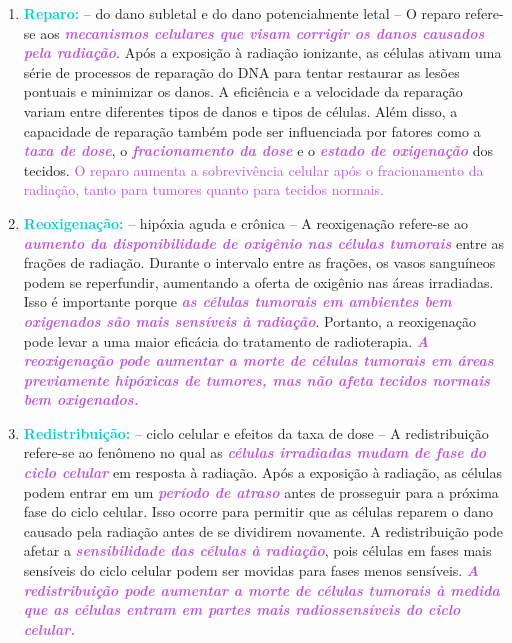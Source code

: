 \documentclass[11pt,a4paper]{article}
\begin{document}
	\begin{enumerate}
		\item \textcolor{DarkTurquoise}{\textbf{Reparo:}} -- do dano subletal e do dano potencialmente letal -- O reparo refere-se aos \textcolor{MediumOrchid}{\textbf{\textit{mecanismos celulares que visam corrigir os danos causados pela radiação}}}. Após a exposição à radiação ionizante, as células ativam uma série de processos de reparação do DNA para tentar restaurar as lesões pontuais e minimizar os danos. A eficiência e a velocidade da reparação variam entre diferentes tipos de danos e tipos de células. Além disso, a capacidade de reparação também pode ser influenciada por fatores como a \textcolor{MediumOrchid}{\textbf{\textit{ taxa de dose}}}, o \textcolor{MediumOrchid}{\textbf{\textit{fracionamento da dose}}} e o \textcolor{MediumOrchid}{\textbf{\textit{estado de oxigenação}}} dos tecidos. \textcolor{MediumOrchid}{O reparo aumenta a sobrevivência celular após o fracionamento da radiação, tanto para tumores quanto para tecidos normais.}
		
		\item \textcolor{DarkTurquoise}{\textbf{Reoxigenação:}} -- hipóxia aguda e crônica -- A reoxigenação refere-se ao \textcolor{MediumOrchid}{\textbf{\textit{aumento da disponibilidade de oxigênio nas células tumorais}}} entre as frações de radiação. Durante o intervalo entre as frações, os vasos sanguíneos podem se reperfundir, aumentando a oferta de oxigênio nas áreas irradiadas. Isso é importante porque \textcolor{MediumOrchid}{\textbf{\textit{as células tumorais em ambientes bem oxigenados são mais sensíveis à radiação}}}. Portanto, a reoxigenação pode levar a uma maior eficácia do tratamento de radioterapia. \textcolor{MediumOrchid}{\textbf{\textit{A reoxigenação pode aumentar a morte de células tumorais em áreas previamente hipóxicas de tumores, mas não afeta tecidos normais bem oxigenados.}}}
				
		\item \textcolor{DarkTurquoise}{\textbf{Redistribuição:}} -- ciclo celular e efeitos da taxa de dose -- A redistribuição refere-se ao fenômeno no qual as \textcolor{MediumOrchid}{\textbf{\textit{células irradiadas mudam de fase do ciclo celular}}} em resposta à radiação. Após a exposição à radiação, as células podem entrar em um \textcolor{MediumOrchid}{\textbf{\textit{período de atraso}}} antes de prosseguir para a próxima fase do ciclo celular. Isso ocorre para permitir que as células reparem o dano causado pela radiação antes de se dividirem novamente. A redistribuição pode afetar a \textcolor{MediumOrchid}{\textbf{\textit{sensibilidade das células à radiação}}}, pois células em fases mais sensíveis do ciclo celular podem ser movidas para fases menos sensíveis. \textcolor{MediumOrchid}{\textbf{\textit{A redistribuição pode aumentar a morte de células tumorais à medida que as células entram em partes mais radiossensíveis do ciclo celular.}}}
		

\end{enumerate}
\end{document}
